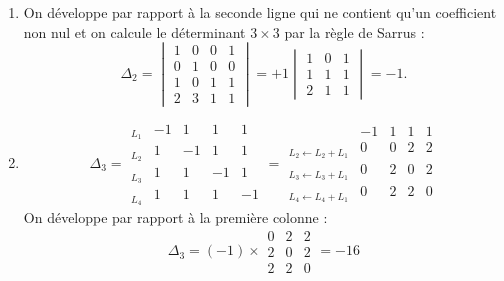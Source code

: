 {{\begin{enumerate}
  \item On développe par rapport à la seconde ligne qui ne contient qu'un coefficient non nul et on calcule le déterminant
$3\times 3$ par la règle de Sarrus :
$$\Delta_2 = \begin{vmatrix}
1&0&0&1 \\ 0&1&0&0 \\ 1&0&1&1 \\ 2&3&1&1
\end{vmatrix}
= +1 \begin{vmatrix}
1&0&1 \\ 1&1&1 \\ 2&1&1
\end{vmatrix}
= -1.$$

  \item
$$\Delta_3 = 
\begin{array}{l|cccc|} 
_{L_1} & -1 & 1 & 1 & 1 \\ _{L_2} & 1 & -1 & 1 & 1\\ _{L_3} & 1 & 1 & -1& 1\\ _{L_4} & 1 & 1& 1&-1
\end{array}
= \begin{array}{l|cccc|} 
 & -1 & 1 & 1 & 1 \\ _{L_2\leftarrow L_2+L_1} & 0 & 0 & 2 & 2\\
 _{L_3\leftarrow L_3+L_1} & 0 & 2 & 0 & 2 \\  _{L_4\leftarrow L_4+L_1} &0 & 2 & 2 & 0
\end{array}
$$
On développe par rapport à la première colonne :
$$\Delta_3 = (-1) \times \begin{array}{|ccc|} 
  0 & 2 & 2\\  2 & 0 & 2 \\  2 & 2 & 0
\end{array} = -16$$


\end{enumerate}}}

